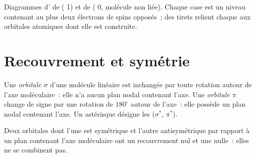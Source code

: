 \begin{omfigure}
\begin{MOdiagram}
\end{MOdiagram}
\hspace{1.5cm}
\begin{MOdiagram}
\end{MOdiagram}

{\small Diagrammes d' de  ( 1) et de  ( 0, molécule non liée). Chaque case est un niveau contenant au plus deux électrons de
spins opposés~; des tirets relient chaque  aux orbitales atomiques
dont elle est construite.}
\end{omfigure}

\section{Recouvrement et symétrie}

\begin{definition}\label{def:b2:diatomic-mos:sigma-pi}
Une \emph{orbitale $\sigma$} d'une molécule linéaire est inchangée par toute
rotation autour de l'axe moléculaire~: elle n'a aucun plan nodal contenant l'axe. Une
\emph{orbitale $\pi$} change de signe par une rotation de $180^\circ$ autour de
l'axe~: elle possède un plan nodal contenant l'axe. Un astérisque désigne les  ($\sigma^*$, $\pi^*$).
\end{definition}

\begin{proposition}\label{prop:b2:diatomic-mos:symmetry}
Deux orbitales dont l'une est symétrique et l'autre antisymétrique par rapport
à un plan contenant l'axe moléculaire ont un recouvrement nul et une  nulle~: elles ne se combinent pas.
\end{proposition}

